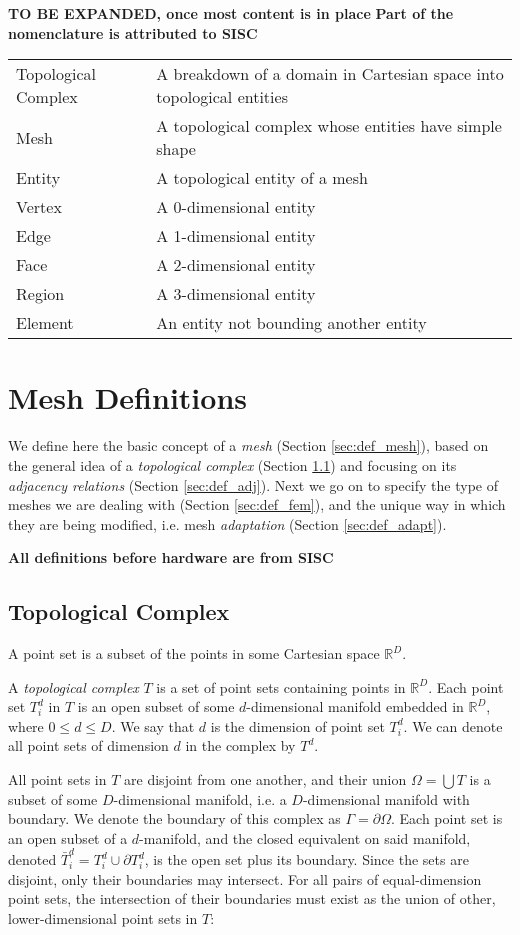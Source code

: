 {\bf TO BE EXPANDED, once most content is in place}
{\bf Part of the nomenclature is attributed to SISC}

\begin{tabular}{l|l}
Topological Complex & A breakdown of a domain in Cartesian space into
topological entities \\
Mesh & A topological complex whose entities have simple shape \\
Entity & A topological entity of a mesh \\
Vertex & A 0-dimensional entity \\
Edge & A 1-dimensional entity \\
Face & A 2-dimensional entity \\
Region & A 3-dimensional entity \\
Element & An entity not bounding another entity \\
\end{tabular}

\section{Mesh Definitions}

We define here the basic concept of a \emph{mesh}
(Section \ref{sec:def_mesh}), based on the general
idea of a \emph{topological complex} (Section \ref{sec:def_complex})
and focusing on its \emph{adjacency relations} (Section \ref{sec:def_adj}).
Next we go on to specify the type of meshes we
are dealing with (Section \ref{sec:def_fem}),
and the unique way in which they are being modified,
i.e. mesh \emph{adaptation} (Section \ref{sec:def_adapt}).

{\bf All definitions before hardware are from SISC}

\subsection{Topological Complex}
\label{sec:def_complex}

A point set is a subset of the points in some Cartesian
space $\mathbb{R}^D$.

A \emph{topological complex} $T$ is a set of point sets
containing points in $\mathbb{R}^D$.
Each point set $T^d_i$ in $T$ is an open subset of some
$d$-dimensional manifold embedded in $\mathbb{R}^D$,
where $0\leq d \leq D$.
We say that $d$ is the dimension of point set $T^d_i$.
We can denote all point sets of dimension $d$ in the
complex by $T^d$.

All point sets in $T$ are disjoint from one another,
and their union $\Omega = \bigcup T$ is a subset of some $D$-dimensional
manifold, i.e. a $D$-dimensional manifold with boundary.
We denote the boundary of this complex as $\Gamma = \partial\Omega$.
Each point set is an open subset of a $d$-manifold,
and the closed equivalent on said manifold,
denoted $\bar{T}^d_i = T^d_i \cup \partial T^d_i$,
is the open set plus its boundary.
Since the sets are disjoint, only their boundaries may intersect.
For all pairs of equal-dimension point sets, the intersection
of their boundaries must exist as the union of other,
lower-dimensional point sets in $T$:

